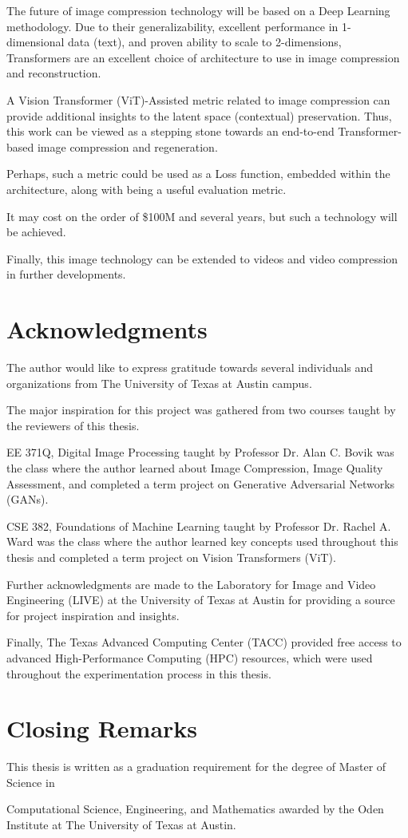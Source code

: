 The future of image compression technology will be based on a Deep Learning methodology.
Due to their generalizability, excellent performance in 1-dimensional data (text),
and proven ability to scale to 2-dimensions, Transformers are an excellent choice of 
architecture to use in image compression and reconstruction.


A Vision Transformer (ViT)-Assisted metric related to image compression can provide 
additional insights to the latent space (contextual) preservation.
Thus, this work can be viewed as a stepping stone towards an end-to-end Transformer-based
image compression and regeneration.


Perhaps, such a metric could be used as a Loss function, embedded within the architecture,
along with being a useful evaluation metric.


It may cost on the order of \$100M and several years, but such a technology will be achieved.


Finally, this image technology can be extended to videos and video compression in further developments.


\section{Acknowledgments}

The author would like to express gratitude towards several individuals and organizations
from The University of Texas at Austin campus.


The major inspiration for this project was gathered from two courses taught by the
reviewers of this thesis.


EE 371Q, Digital Image Processing taught by Professor Dr. Alan C. Bovik was the class
where the author learned about 
Image Compression, Image Quality Assessment, and completed a term
project on Generative Adversarial Networks (GANs).


CSE 382, Foundations of Machine Learning taught by Professor Dr. Rachel A. Ward 
was the class where the author learned key concepts used throughout this thesis
and completed a term project on Vision Transformers (ViT).


Further acknowledgments are made to the Laboratory for Image and Video Engineering (LIVE) at the 
University of Texas at Austin for providing a source for project inspiration and insights.


Finally, The Texas Advanced Computing Center (TACC) provided free access to advanced 
High-Performance Computing (HPC) resources, which were used throughout the experimentation process in this thesis.

\section{Closing Remarks}

This thesis is written as a graduation requirement for the degree of Master of Science in

Computational Science, Engineering, and Mathematics awarded by the Oden Institute at 
The University of Texas at Austin.




